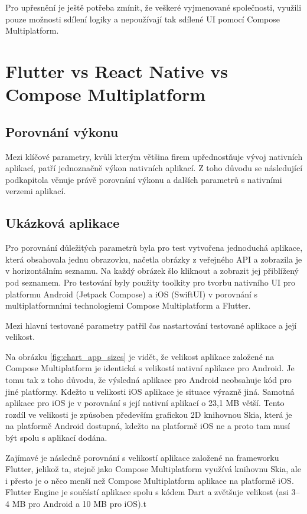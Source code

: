 Pro upřesnění je ještě potřeba zmínit, že veškeré vyjmenované společnosti, využili pouze možnosti sdílení logiky a nepoužívají
tak sdílené UI pomocí Compose Multiplatform.

\section{Flutter vs React Native vs Compose Multiplatform}


\subsection{Porovnání výkonu}

Mezi klíčové parametry, kvůli kterým většina firem upřednostňuje vývoj nativních aplikací, patří jednoznačně výkon
nativních aplikací. Z toho důvodu se následující podkapitola věnuje právě porovnání výkonu a dalších parametrů s
nativními verzemi aplikací. 


\subsection*{Ukázková aplikace}

Pro porovnání důležitých parametrů byla pro test vytvořena jednoduchá aplikace, která obsahovala jednu obrazovku, 
načetla obrázky z veřejného API a zobrazila je v horizontálním seznamu. 
Na každý obrázek šlo kliknout a zobrazit jej přiblížený pod seznamem. 
Pro testování byly použity toolkity pro tvorbu nativního UI pro platformu Android (Jetpack Compose) a iOS (SwiftUI)
v porovnání s multiplatformními technologiemi Compose Multiplatform a Flutter.

Mezi hlavní testované parametry patřil čas nastartování testované aplikace a její velikost.


Na obrázku \ref{fig:chart_app_sizes} je vidět, že velikost aplikace založené na Compose Multiplatform je identická
s velikostí nativní aplikace pro Android. Je tomu tak z toho důvodu, že výsledná aplikace pro Android neobsahuje kód 
pro jiné platformy. Kdežto u velikosti iOS aplikace je situace výrazně jiná. Samotná aplikace pro iOS je v porovnání
s její nativní aplikací o 23,1 MB větší. Tento rozdíl ve velikosti je způsoben především grafickou 2D knihovnou Skia,
která je na platformě Android dostupná, kdežto na platformě iOS ne a proto tam musí být spolu s aplikací dodána.

Zajímavé je následně porovnání s velikostí aplikace založené na frameworku Flutter, jelikož ta, stejně jako Compose
Multiplatform využívá knihovnu Skia, ale i přesto je o něco menší než Compose Multiplatform aplikace na platformě iOS.
Flutter Engine je součástí aplikace spolu s kódem Dart a zvětšuje velikost (asi 3–4 MB pro Android a 10 MB pro iOS).t

